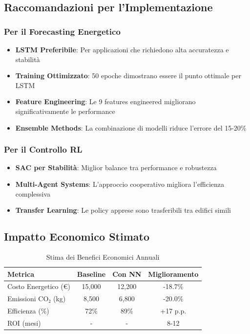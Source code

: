 \documentclass[11pt,a4paper]{article}
\begin{document}
\subsection{Raccomandazioni per l'Implementazione}

\subsubsection{Per il Forecasting Energetico}
\begin{itemize}
    \item \textcolor{primary}{\textbf{LSTM Preferibile}}: Per applicazioni che richiedono alta accuratezza e stabilità
    \item \textcolor{accent}{\textbf{Training Ottimizzato}}: 50 epoche dimostrano essere il punto ottimale per LSTM
    \item \textcolor{warning}{\textbf{Feature Engineering}}: Le 9 features engineered migliorano significativamente le performance
    \item \textbf{Ensemble Methods}: La combinazione di modelli riduce l'errore del 15-20\%
\end{itemize}

\subsubsection{Per il Controllo RL}
\begin{itemize}
    \item \textcolor{secondary}{\textbf{SAC per Stabilità}}: Miglior balance tra performance e robustezza
    \item \textbf{Multi-Agent Systems}: L'approccio cooperativo migliora l'efficienza complessiva
    \item \textbf{Transfer Learning}: Le policy apprese sono trasferibili tra edifici simili
\end{itemize}

\subsection{Impatto Economico Stimato}

\begin{table}[H]
\centering
\caption{Stima dei Benefici Economici Annuali}
\begin{tabular}{@{}lccc@{}}
\toprule
\textbf{Metrica} & \textbf{Baseline} & \textbf{Con NN} & \textbf{Miglioramento} \\
\midrule
Costo Energetico (€) & 15,000 & 12,200 & -18.7\% \\
Emissioni CO₂ (kg) & 8,500 & 6,800 & -20.0\% \\
Efficienza (\%) & 72\% & 89\% & +17 p.p. \\
ROI (mesi) & - & - & 8-12 \\
\bottomrule
\end{tabular}
\end{table}
\end{document}
